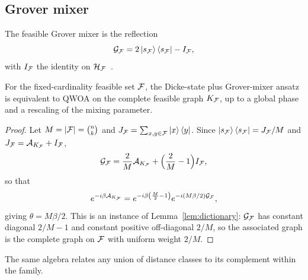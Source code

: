 \subsection{\label{subsec:grover}Grover mixer}

The feasible Grover mixer is the reflection
\begin{equation}
    \mathcal{G}_{\mathcal{F}}
    =
    2\ket{s_{\mathcal{F}}}\bra{s_{\mathcal{F}}}-I_{\mathcal{F}},
    \label{eq:grover-reflection}
\end{equation}
with $I_{\mathcal{F}}$ the identity on
$\mathcal{H}_{\mathcal{F}}$~\cite{Bartschi2020,Bridi2024}.

\begin{proposition}
\label{prop:grover-complete-qwoa}
For the fixed-cardinality feasible set $\mathcal{F}$, the Dicke-state plus
Grover-mixer ansatz is equivalent to QWOA on the complete feasible graph
$K_{\mathcal{F}}$, up to a global phase and a rescaling of the mixing parameter.
\end{proposition}

\begin{proof}
Let $M=|\mathcal{F}|=\binom{n}{k}$ and $J_{\mathcal{F}}=\sum_{x,y\in\mathcal{F}}\ket{x}\bra{y}$. Since
$\ket{s_{\mathcal{F}}}\bra{s_{\mathcal{F}}}=J_{\mathcal{F}}/M$ and
$J_{\mathcal{F}}=\mathcal{A}_{K_{\mathcal{F}}}+I_{\mathcal{F}}$,
\begin{equation}
    \mathcal{G}_{\mathcal{F}}
    =
    \frac{2}{M}\mathcal{A}_{K_{\mathcal{F}}}
    +\Bigl(\frac{2}{M}-1\Bigr)I_{\mathcal{F}},
\end{equation}
so that
\begin{equation}
    e^{-i\beta \mathcal{A}_{K_{\mathcal{F}}}}
    =
    e^{-i\beta\left(\frac{M}{2}-1\right)}
    e^{-i(M\beta/2)\mathcal{G}_{\mathcal{F}}},
    \label{eq:grover-rescaling}
\end{equation}
giving $\theta=M\beta/2$. This is an instance of
Lemma~\ref{lem:dictionary}: $\mathcal{G}_{\mathcal{F}}$ has constant diagonal $2/M-1$ and
constant positive off-diagonal $2/M$, so the associated graph is the complete
graph on $\mathcal{F}$ with uniform weight $2/M$.
\end{proof}

The same algebra relates any union of distance classes to its complement
within the family.

